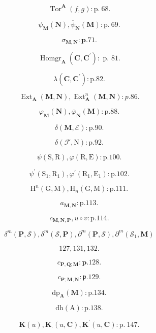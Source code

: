\[
\operatorname{Tor} ^ {\mathbf {A}} (f, g): \mathrm{p.~68}.
\]

\[
\psi_ {\mathbf {M}} (\mathbf {N}), \overline {{\psi}} _ {\mathbf {N}} (\mathbf {M}): \mathrm{p.~69}.
\]

\[
\sigma_ {\mathbf {M}, \mathbf {N}}: \mathbf {p}. 7 1.
\]

\[
\operatorname{Homgr} _ {\mathbf {A}} (\mathbf {C}, \mathbf {C} ^ {\prime}): \text { p. } 8 1.
\]

\[
\lambda (\mathbf {C}, \mathbf {C} ^ {\prime}): \mathrm{p.} 8 2.
\]

\[
\operatorname{Ext} _ {\mathbf {A}} (\mathbf {M}, \mathbf {N}), \operatorname{Ext} _ {\mathbf {A}} ^ {n} (\mathbf {M}, \mathbf {N}): p. 8 6.
\]

\[
\varphi_ {\mathbf {M}} (\mathbf {N}), \overline {{\varphi}} _ {\mathbf {N}} (\mathbf {M}): \mathrm{p.} 8 8.
\]

\[
\delta (\mathbf {M}, \mathcal {E}): \mathrm{p.} 9 0.
\]

\[
\delta (\mathcal {F}, \mathrm{N}): \mathrm{p.} 9 2.
\]

\[
\psi (\mathrm{S}, \mathrm{R}), \varphi (\mathrm{R}, \mathrm{E}): \mathrm{p}. 1 0 0.
\]

\[
\psi^ {\prime} \left(\mathrm{S} _ {1}, \mathrm{R} _ {1}\right), \varphi^ {\prime} \left(\mathrm{R} _ {1}, \mathrm{E} _ {1}\right): \mathrm{p}. 1 0 2.
\]

\[
\mathrm{H} ^ {n} (\mathrm{G}, \mathrm{M}), \mathrm{H} _ {n} (\mathrm{G}, \mathrm{M}): \mathrm{p}. 1 1 1.
\]

\[
a _ {\mathbf {M}, \mathbf {N}}: \mathrm{p.} 1 1 3.
\]

\[
c _ {\mathbf {M}, \mathbf {N}, \mathbf {P}}, u \circ v: \mathrm{p}. 1 1 4.
\]

\[
\delta^ {m} (\mathbf {P}, \mathcal {S}), \delta^ {m} (\mathcal {S}, \mathbf {P}), \partial^ {m} (\mathbf {P}, \mathcal {S}), \partial^ {m} (\mathcal {S} _ {1}, \mathbf {M})
\]

\[
1 2 7, 1 3 1, 1 3 2.
\]

\[
c _ {\mathbf {P}, \mathbf {Q}; \mathbf {M}}: \mathbf {p}. 1 2 8.
\]

\[
c _ {\mathbf {P}; \mathbf {M}, \mathbf {N}}: \mathfrak {p}. 1 2 9.
\]

\[
\mathrm{dp} _ {\mathbf {A}} (\mathbf {M}): \mathrm{p}. 1 3 4.
\]

\[
\mathrm{dh} (\mathrm{A}): \mathrm{p}. 1 3 8.
\]

\[
\mathbf {K} (u), \mathbf {K} _ {\cdot} (u, \mathbf {C}), \mathbf {K} ^ {\prime} (u, \mathbf {C}): \mathrm{p.~147.}
\]

